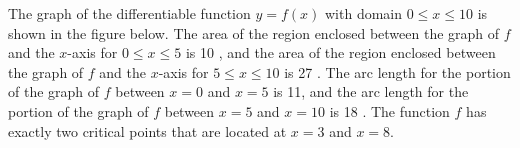 \documentclass[12pt,addpoints,answers]{exam}
\begin{document}
\begin{questions}
\begin{solution}
\end{solution}

\question
The graph of the differentiable function $y=f(x)$ with domain $0 \leq x \leq 10$ is shown in the figure below. The area of the region enclosed between the graph of $f$ and the $x$-axis for $0 \leq x \leq 5$ is 10 , and the area of the region enclosed between the graph of $f$ and the $x$-axis for $5 \leq x \leq 10$ is 27 . The arc length for the portion of the graph of $f$ between $x=0$ and $x=5$ is 11, and the arc length for the portion of the graph of $f$ between $x=5$ and $x=10$ is 18 . The function $f$ has exactly two critical points that are located at $x=3$ and $x=8$.\\
\begin{solution}
\begin{parts}

\end{parts}
\end{solution}
\end{questions}
\end{document}
